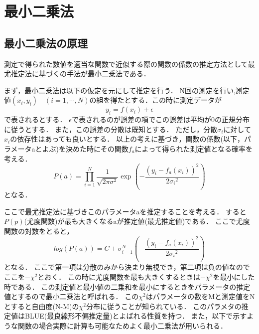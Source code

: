 \section{最小二乗法}

\subsection{最小二乗法の原理}
測定で得られた数値を適当な関数で近似する際の関数の係数の推定方法として最尤推定法に基づくの手法が最小二乗法である．

まず，最小二乗法は以下の仮定を元にして推定を行う．
N回の測定を行い,測定値$(x_i,y_i)\quad(i=1,\cdots,N)$の組を得たとする．この時に測定データが
\begin{equation}
  y_i = f(x_i) + \epsilon
\end{equation}
で表されるとする．
$\epsilon$で表されるのが誤差の項でこの誤差は平均が0の正規分布に従うとする．
また，この誤差の分散は既知とする．
ただし，分散$\sigma_i$に対して$x_i$の依存性はあっても良いとする．
以上の考えに基づき，関数の係数(以下，パラメータaとよぶ)を決めた時にその関数$f_a$によって得られた測定値となる確率を考える．
\begin{equation}
  P(a) = \prod_{i=1}^N \frac{1}{\sqrt{2\pi\sigma^2}}\exp\left(-\frac{(y_i-f_a(x_i))^2}{2{\sigma_i}^2}\right)
\end{equation}
となる．

ここで最尤推定法に基づきこのパラメータaを推定することを考える．
すると$P(p)$(尤度関数)が最も大きくなるaが推定値(最尤推定値)である．
ここで尤度関数の対数をとると，
\begin{equation}
  log(P(a)) = C + \sigma_{i=1}^N \left(-\frac{(y_i-f_a(x_i))^2}{2{\sigma_i}^2}\right)
\end{equation}
となる．
ここで第一項は分散のみから決まり無視でき，第二項は負の値なのでここを$-\chi^2$とおく．
この時に尤度関数を最も大きくするときは$-\chi^2$を最小にした時である．
この測定値と最小値の二乗和を最小にするときをパラメータの推定値とするので最小二乗法と呼ばれる．
この$\chi^2$はパラメータの数をMと測定値をNとすると自由度(N-M)の$\chi^2$分布に従うことが知られている．
このパラメタの推定値はBLUE(最良線形不偏推定量)とよばれる性質を持つ．
また，以下で示すような関数の場合実際に計算も可能なためよく最小二乗法が用いられる．

